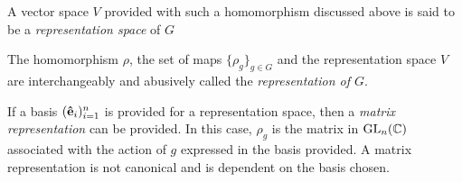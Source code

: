 \begin{notation}
	A vector space $V$ provided with such a homomorphism discussed above is said to be a \textit{representation space} of $G$%
\end{notation}

\begin{note}
	The homomorphism $\rho$, the set of maps $\{\rho_g\}_{g \in G}$ and the representation space $V$ are interchangeably and abusively called the \textit{representation of $G$}.
\end{note}


If a basis $(\mathbf{\hat{e}}_i)_{i=1}^n$ is provided for a representation space, then a \textit{matrix representation} can be provided. In this case, $\rho_g$ is the matrix in $\text{GL}_n(\mathbb{C})$ associated with the action of $g$ expressed in the basis provided. A matrix representation is not canonical and is dependent on the basis chosen.